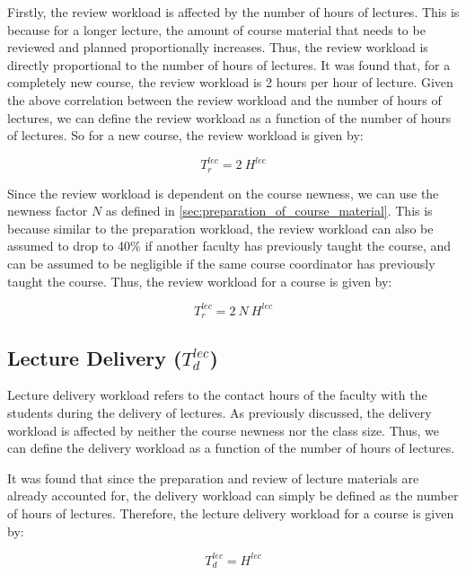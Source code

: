 Firstly, the review workload is affected by the number of hours of lectures. This is because for a longer lecture, the amount of course material that needs to be reviewed and planned proportionally increases. Thus, the review workload is directly proportional to the number of hours of lectures. It was found that, for a completely new course, the review workload is 2 hours per hour of lecture. Given the above correlation between the review workload and the number of hours of lectures, we can define the review workload as a function of the number of hours of lectures. So for a new course, the review workload is given by:

\begin{equation*}
  \label{eqn:review-workload}
  T_r^{lec} = 2\ H^{lec}
\end{equation*}

Since the review workload is dependent on the course newness, we can use the newness factor \(N\) as defined in \autoref{sec:preparation_of_course_material}. This is because similar to the preparation workload, the review workload can also be assumed to drop to 40\% if another faculty has previously taught the course, and can be assumed to be negligible if the same course coordinator has previously taught the course. Thus, the review workload for a course is given by:

\begin{equation}
  \label{eqn:review-workload-total}
  T_r^{lec} = 2\ N \ H^{lec}
\end{equation}


\subsection{Lecture Delivery (\texorpdfstring{$T_d^{lec}$}{})}

Lecture delivery workload refers to the contact hours of the faculty with the students during the delivery of lectures. As previously discussed, the delivery workload is affected by neither the course newness nor the class size. Thus, we can define the delivery workload as a function of the number of hours of lectures.

It was found that since the preparation and review of lecture materials are already accounted for, the delivery workload can simply be defined as the number of hours of lectures. Therefore, the lecture delivery workload for a course is given by:

\begin{equation}
  \label{eqn:lecture-delivery-workload}
  T_d^{lec} = H^{lec}
\end{equation}

